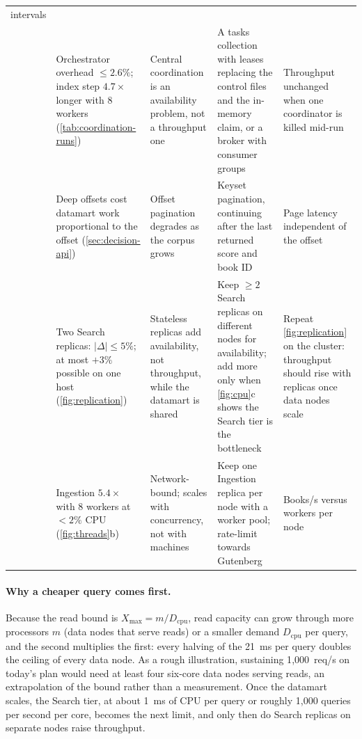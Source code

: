 \documentclass[10pt,a4paper]{article}
\begin{document}
\begin{table}[htbp]
\begin{tabularx}{\textwidth}{@{}r>{\raggedright\arraybackslash}p{3.4cm}>{\raggedright\arraybackslash}p{2.9cm}>{\raggedright\arraybackslash}X>{\raggedright\arraybackslash}p{3.1cm}@{}}
      intervals \\
    \addlinespace
    4 & Orchestrator overhead $\le 2.6\%$; index step $4.7\times$ longer with 8
      workers (\cref{tab:coordination-runs}) &
      Central coordination is an availability problem, not a throughput one &
      A tasks collection with leases replacing the control files and the
      in-memory claim, or a broker with consumer groups &
      Throughput unchanged when one coordinator is killed mid-run \\
    \addlinespace
    5 & Deep offsets cost datamart work proportional to the offset
      (\cref{sec:decision-api}) &
      Offset pagination degrades as the corpus grows &
      Keyset pagination, continuing after the last returned score and book ID &
      Page latency independent of the offset \\
    \addlinespace
    6 & Two Search replicas: $|\Delta| \le 5\%$; at most $+3\%$ possible on one
      host (\cref{fig:replication}) &
      Stateless replicas add availability, not throughput, while the datamart is
      shared &
      Keep $\ge 2$ Search replicas on different nodes for availability; add more
      only when \cref{fig:cpu}c shows the Search tier is the bottleneck &
      Repeat \cref{fig:replication} on the cluster: throughput should rise with
      replicas once data nodes scale \\
    \addlinespace
    7 & Ingestion $5.4\times$ with 8 workers at $<2\%$ CPU (\cref{fig:threads}b) &
      Network-bound; scales with concurrency, not with machines &
      Keep one Ingestion replica per node with a worker pool; rate-limit towards
      Gutenberg &
      Books/s versus workers per node \\
    \bottomrule
  \end{tabularx}
\end{table}

\paragraph{Why a cheaper query comes first.}
Because the read bound is $X_{\max} = m / D_{\text{cpu}}$, read capacity can grow
through more processors $m$ (data nodes that serve reads) or a smaller demand
$D_{\text{cpu}}$ per query, and the second multiplies the first: every halving of
the 21~ms per query doubles the ceiling of every data node. As a rough
illustration, sustaining 1{,}000~req/s on today's plan would need at least four
six-core data nodes serving reads, an extrapolation of the bound rather than a
measurement. Once the datamart scales, the Search tier, at about 1~ms of CPU per
query or roughly 1{,}000 queries per second per core, becomes the next limit,
and only then do Search replicas on separate nodes raise throughput.
\end{document}

